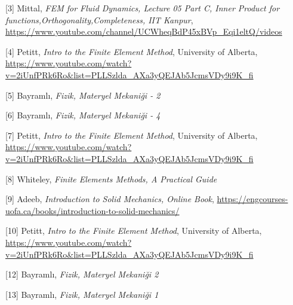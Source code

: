 \documentclass[12pt,fleqn]{article}\usepackage{../../common}
\begin{document}
[3] Mittal, {\em FEM for Fluid Dynamics, Lecture 05 Part C, Inner Product for functions,Orthogonality,Completeness, IIT Kanpur},
    \url{https://www.youtube.com/channel/UCWheqBdP45xBVp_Eqi1eltQ/videos}
    
[4] Petitt, {\em Intro to the Finite Element Method}, University of Alberta,
    \url{https://www.youtube.com/watch?v=2iUnfPRk6Ro&list=PLLSzlda_AXa3yQEJAb5JcmsVDy9i9K_fi}

[5] Bayramlı, {\em Fizik, Materyel Mekaniği - 2}
    
[6] Bayramlı, {\em Fizik, Materyel Mekaniği - 4}

[7] Petitt, {\em Intro to the Finite Element Method}, University of Alberta,
    \url{https://www.youtube.com/watch?v=2iUnfPRk6Ro&list=PLLSzlda_AXa3yQEJAb5JcmsVDy9i9K_fi}

[8] Whiteley, {\em Finite Elements Methods, A Practical Guide}
    
[9] Adeeb, {\em Introduction to Solid Mechanics, Online Book},
    \url{https://engcourses-uofa.ca/books/introduction-to-solid-mechanics/}

[10] Petitt, {\em Intro to the Finite Element Method}, University of Alberta,
    \url{https://www.youtube.com/watch?v=2iUnfPRk6Ro&list=PLLSzlda_AXa3yQEJAb5JcmsVDy9i9K_fi}

[12] Bayramlı, {\em Fizik, Materyel Mekaniği 2}
    
[13] Bayramlı, {\em Fizik, Materyel Mekaniği 1}
\end{document}
